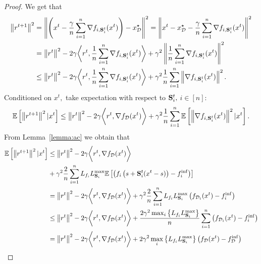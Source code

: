 \documentclass{article}
\newcommand{\bb}{\mathbb}
\newcommand{\cD}{\mathcal{D}}
\newcommand{\Exp}[1]{{\bb E}\left[#1\right]}
\theoremstyle{plain}
\newcommand{\tf}{f_{\mathcal{D}}}
\newcommand{\mS}{{\bf S}}
\theoremstyle{plain}
\theoremstyle{definition}
\theoremstyle{remark}
\begin{document}
\begin{proof}
	We get that
	\begin{equation*}
		\begin{split}
			\left\|r^{t+1}\right\|^2 & = \left\|\left(x^t-\frac{\gamma}{n}\sum_{i=1}^{n}\nabla f_{i,\mS_i^{t}}(x^t) \right) - x_\cD^\star\right\|^2  = \left\|x^t-x_\cD^\star - \frac{\gamma}{n}\sum_{i=1}^{n}\nabla f_{i,\mS_i^{t}}(x^t)\right\|^2 \\
			& = \left\|r^{t}\right\|^2 - 2\gamma\bigg{<}r^t, \frac{1}{n}\sum_{i=1}^{n}\nabla f_{i,\mS_i^{t}}(x^t)\bigg{>} + \gamma^2\left\|\frac{1}{n}\sum_{i=1}^{n}\nabla f_{i,\mS_i^{t}}(x^t)\right\|^2\\
			& \leq \left\|r^{t}\right\|^2 - 2\gamma\bigg{<}r^t, \frac{1}{n}\sum_{i=1}^{n}\nabla f_{i,\mS_i^{t}}(x^t)\bigg{>} + \gamma^2\frac{1}{n}\sum_{i=1}^{n}\left\|\nabla f_{i,\mS_i^{t}}(x^t)\right\|^2.\\
		\end{split}
	\end{equation*}
	Conditioned on $x^t,$ take expectation with respect to $\mS^{t}_i,$ $i\in[n]:$
	\begin{equation*}
		\begin{split}
			\Exp{\left\|r^{t+1}\right\|^2|x^t} & \leq \left\|r^{t}\right\|^2 - 2\gamma\bigg{<}r^t, \nabla \tf(x^t)\bigg{>} + \gamma^2\frac{1}{n}\sum_{i=1}^{n}\Exp{\left\|\nabla f_{i,\mS_i^{t}}(x^t)\right\|^2|x^t}.\\
		\end{split}
	\end{equation*}
	From Lemma~\ref{lemma:ac} we obtain that
	\begin{equation*}
		\begin{split}
			\Exp{\left\|r^{t+1}\right\|^2|x^t} & \leq \left\|r^{t}\right\|^2 - 2\gamma\bigg{<}r^t, \nabla \tf(x^t)\bigg{>}\\
                & + \gamma^2\frac{2}{n}\sum_{i=1}^{n}L_{f_i}L_{\mS_i}^{\max} \Exp{\left(f_i\left(s+\mS_{i}^t(x^t-s)\right) - f_i^{\inf}\right)}\\
			& = \left\|r^{t}\right\|^2 - 2\gamma\bigg{<}r^t, \nabla \tf(x^t)\bigg{>} + \gamma^2\frac{2}{n}\sum_{i=1}^{n}L_{f_i}L_{\mS_i}^{\max}\left(f_{\mathcal{D}_i}(x^t)-f_i^{\inf}\right)\\
			& \leq \left\|r^{t}\right\|^2 - 2\gamma\bigg{<}r^t, \nabla \tf(x^t)\bigg{>} + \frac{2\gamma^2\max_i\left\lbrace L_{f_i}L_{\mS_i}^{\max} \right\rbrace }{n}\sum_{i=1}^{n}\left(f_{\mathcal{D}_i}(x^t)-f_i^{\inf}\right)\\
			& = \left\|r^{t}\right\|^2 - 2\gamma\bigg{<}r^t, \nabla \tf(x^t)\bigg{>} + 2\gamma^2\max_i\left\lbrace L_{f_i}L_{\mS_i}^{\max} \right\rbrace\left(\tf(x^t) - \tf^{\inf}\right)\\

\end{split}
\end{equation*}
\end{proof}
\end{document}
